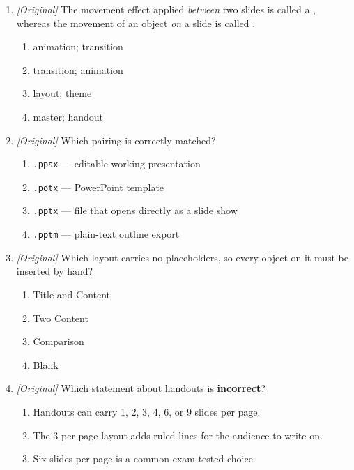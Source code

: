\documentclass[11pt]{article}
\begin{document}
\begin{enumerate}[label=\textbf{Q\arabic*.}, leftmargin=*]
\begin{enumerate}[label=\Alph*.]
    \item Ctrl+F5
    \item Alt+F5
    \item Ctrl+Shift+F5
  \end{enumerate}
\item \textit{[Original]} The movement effect applied \textit{between} two
  slides is called a \underline{\hspace{2.2cm}}, whereas the movement of an
  object \textit{on} a slide is called \underline{\hspace{2.2cm}}.
  \begin{enumerate}[label=\Alph*.]
    \item animation; transition
    \item transition; animation
    \item layout; theme
    \item master; handout
  \end{enumerate}
\item \textit{[Original]} Which pairing is correctly matched?
  \begin{enumerate}[label=\Alph*.]
    \item \texttt{.ppsx} --- editable working presentation
    \item \texttt{.potx} --- PowerPoint template
    \item \texttt{.pptx} --- file that opens directly as a slide show
    \item \texttt{.pptm} --- plain-text outline export
  \end{enumerate}
\item \textit{[Original]} Which layout carries no placeholders, so every
  object on it must be inserted by hand?
  \begin{enumerate}[label=\Alph*.]
    \item Title and Content
    \item Two Content
    \item Comparison
    \item Blank
  \end{enumerate}
\item \textit{[Original]} Which statement about handouts is
  \textbf{incorrect}?
  \begin{enumerate}[label=\Alph*.]
    \item Handouts can carry 1, 2, 3, 4, 6, or 9 slides per page.
    \item The 3-per-page layout adds ruled lines for the audience to write on.
    \item Six slides per page is a common exam-tested choice.

\end{enumerate}
\end{enumerate}
\end{document}
